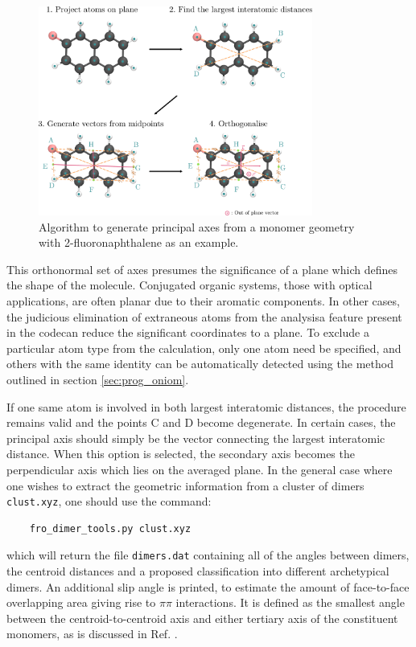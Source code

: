 \begin{figure}[ht]
\centering
  \includegraphics[width=9cm]{Chapters/6Implementation/vectors.pdf}
  \caption{Algorithm to generate principal axes from a monomer geometry with 2-fluoronaphthalene as an example.}
  \label{fig:vectors}
\end{figure}

This orthonormal set of axes presumes the significance of a plane which defines the shape of the molecule. Conjugated organic systems, those with optical applications, are often planar due to their aromatic components.\cite{Gierschner2016} In other cases, the judicious elimination of extraneous atoms from the analysis\textemdash{}a feature present in the code\textemdash{}can reduce the significant coordinates to a plane. To exclude a particular atom type from the calculation, only one atom need be specified, and others with the same identity can be automatically detected using the method outlined in section \ref{sec:prog_oniom}. 

If one same atom is involved in both largest interatomic distances, the procedure remains valid and the points C and D become degenerate. In certain cases, the principal axis should simply be the vector connecting the largest interatomic distance. When this option is selected, the secondary axis becomes the perpendicular axis which lies on the averaged plane. In the general case where one wishes to extract the geometric information from a cluster of dimers \texttt{clust.xyz}, one should use the command:
\begin{verbatim}
    fro_dimer_tools.py clust.xyz
\end{verbatim}
which will return the file \texttt{dimers.dat} containing all of the angles between dimers, the centroid distances and a proposed classification into different archetypical dimers. An additional slip angle is printed, to estimate the amount of face-to-face overlapping area giving rise to $\pi\pi$ interactions. It is defined as the smallest angle between the centroid-to-centroid axis and either tertiary axis of the constituent monomers, as is discussed in Ref. .


